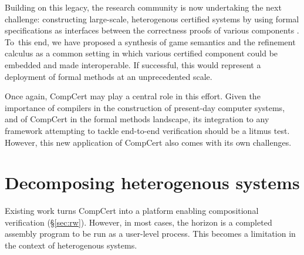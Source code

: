 \documentclass[draft,11pt]{report}
\begin{document}
Building on this legacy,
the research community is now undertaking the next challenge:
constructing large-scale, heterogenous certified systems
by using formal specifications as interfaces
between the correctness proofs of various components%
\cite{deepspec}.
To~this end, we have proposed
a synthesis of game semantics and the refinement calculus
\cite{rbgs-cal}
as a common setting
in which various
certified component could be embedded and
made interoperable.
If successful,
this would represent a deployment of formal methods
at an unprecedented scale.


Once again,
CompCert may play a central role in this effort.
Given the importance of compilers in
the construction of present-day computer systems,
and of CompCert in the formal methods landscape,
its integration to any framework
attempting to tackle end-to-end verification
should be a litmus test.
However, this new application of CompCert also
comes with its own challenges.


\section{Decomposing heterogenous systems} %

Existing work turns CompCert
into a platform enabling compositional verification (\S\ref{sec:rw}).
However, in most cases,
the horizon is a completed assembly program to be run as a user-level process.
This becomes a limitation in the context of heterogenous systems.
\end{document}
